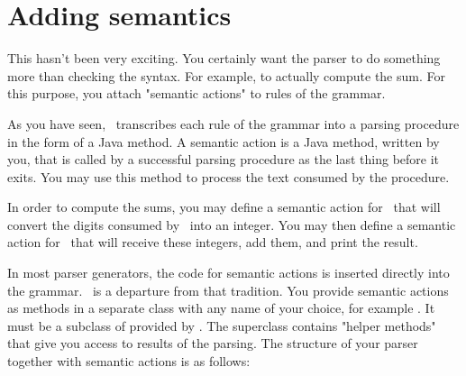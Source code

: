 
\section{Adding semantics\label{Semantics}}


This hasn't been very exciting.
You certainly want the parser to do something more than checking the syntax.
For example, to actually compute the sum.
For this purpose, you attach "semantic actions" to rules of the grammar.

As you have seen, \Mouse\ transcribes each rule of the grammar into a parsing procedure
in the form of a Java method.
A semantic action is a Java method, written by you,
that is called by a successful parsing procedure as the last thing before it exits.
You may use this method to process the text consumed by the procedure.

In order to compute the sums, you may define a semantic action for \Number\
that will convert the digits consumed by \Number\ into an integer.
You may then define a semantic action for \Sum\ that will receive these integers,
add them, and print the result.

In most parser generators, the code for semantic actions
is inserted directly into the grammar.
\Mouse\ is a departure from that tradition.
You provide semantic actions as methods in a separate class
with any name of your choice,
for example .
It must be a subclass of 
provided by \Mouse.
The superclass  contains "helper methods"
that give you access to results of the parsing.
The structure of your parser together with semantic actions is as follows:

